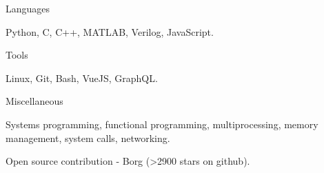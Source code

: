 \begin{cventries}
  \cventry
    {Languages}
    {}
    {}
    {}
    {
      \begin{cvitems}
        \item {Python, C, C++, MATLAB, Verilog, JavaScript.}
      \end{cvitems}
    }
  \cventry
    {Tools}
    {}
    {}
    {}
    {
      \begin{cvitems}
        \item {Linux, Git, Bash, VueJS, GraphQL.}
      \end{cvitems}
    }
  \cventry
    {Miscellaneous}
    {}
    {}
    {}
    {
      \begin{cvitems}
        \item {Systems programming, functional programming, multiprocessing, memory management, system calls, networking.}
        \item {Open source contribution - Borg (>2900 stars on github).}
      \end{cvitems}
    }
\end{cventries}
